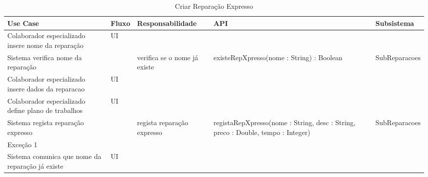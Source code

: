 \documentclass[../relatorio.tex]{subfiles}
\begin{document}
\begin{landscape}
    \begin{table}[!h]
        \centering
        \begin{tabular}{|p{5cm}|p{1cm}|p{4cm}|p{6cm}|p{3cm}|}
            \hline
            \rowcolor{gray!20!white}
            Use Case & Fluxo                                            & Responsabilidade & API & Subsistema \\
            \hline
            \rowcolor{yellow}
            Colaborador especializado insere nome da reparação
                     & UI
                     & 
                     & 
                     & 
            \\
            \hline
            Sistema verifica nome da reparação
                     & 
                     & verifica se o nome já existe
                     & existeRepXpresso(nome : String) : Boolean
                     & SubReparacoes
            \\
            \hline
            \rowcolor{yellow}
            Colaborador especializado insere dados da reparacao
                     & UI
                     & 
                     & 
                     & 
            \\
            \hline
            Colaborador especializado define plano de trabalhos
                     & UI
                     & 
                     & 
                     & 
            \\
            \hline
            Sistema regista reparação expresso
                     & 
                     & regista reparação expresso
                     & registaRepXpresso(nome : String, desc : String, preco : Double, tempo : Integer)
                     & SubReparacoes
            \\
            \hline
            \rowcolor{red!30}
            Exceção 1 &                                                  &                  &     &            \\
            \hline
            Sistema comunica que nome da reparação já existe
                     & UI
                     & 
                     & 
                     & 
            \\
            \hline
        \end{tabular}
        \caption{Criar Reparação Expresso}
    \end{table}
\end{landscape}
\end{document}
